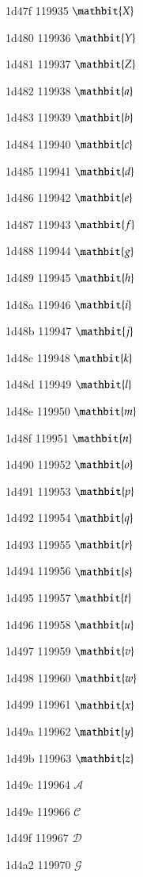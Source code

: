 \documentclass[11pt]{article}
\begin{document}
1d47f 119935 \ensuremath{\mathbit{X}}

1d480 119936 \ensuremath{\mathbit{Y}}

1d481 119937 \ensuremath{\mathbit{Z}}

1d482 119938 \ensuremath{\mathbit{a}}

1d483 119939 \ensuremath{\mathbit{b}}

1d484 119940 \ensuremath{\mathbit{c}}

1d485 119941 \ensuremath{\mathbit{d}}

1d486 119942 \ensuremath{\mathbit{e}}

1d487 119943 \ensuremath{\mathbit{f}}

1d488 119944 \ensuremath{\mathbit{g}}

1d489 119945 \ensuremath{\mathbit{h}}

1d48a 119946 \ensuremath{\mathbit{i}}

1d48b 119947 \ensuremath{\mathbit{j}}

1d48c 119948 \ensuremath{\mathbit{k}}

1d48d 119949 \ensuremath{\mathbit{l}}

1d48e 119950 \ensuremath{\mathbit{m}}

1d48f 119951 \ensuremath{\mathbit{n}}

1d490 119952 \ensuremath{\mathbit{o}}

1d491 119953 \ensuremath{\mathbit{p}}

1d492 119954 \ensuremath{\mathbit{q}}

1d493 119955 \ensuremath{\mathbit{r}}

1d494 119956 \ensuremath{\mathbit{s}}

1d495 119957 \ensuremath{\mathbit{t}}

1d496 119958 \ensuremath{\mathbit{u}}

1d497 119959 \ensuremath{\mathbit{v}}

1d498 119960 \ensuremath{\mathbit{w}}

1d499 119961 \ensuremath{\mathbit{x}}

1d49a 119962 \ensuremath{\mathbit{y}}

1d49b 119963 \ensuremath{\mathbit{z}}

1d49c 119964 \ensuremath{\mathscr{A}}

1d49e 119966 \ensuremath{\mathscr{C}}

1d49f 119967 \ensuremath{\mathscr{D}}

1d4a2 119970 \ensuremath{\mathscr{G}}
\end{document}
